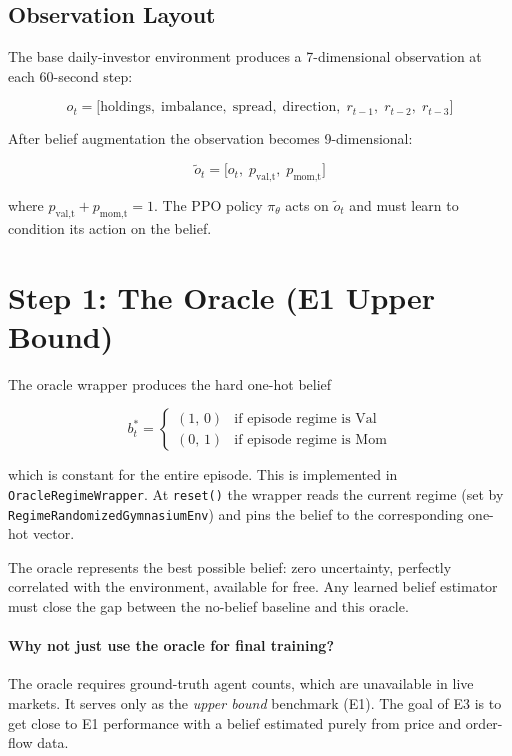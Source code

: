 \documentclass[11pt]{article}
\begin{document}
\subsection{Observation Layout}

The base daily-investor environment produces a 7-dimensional observation at
each 60-second step:

\[
o_t = \bigl[\text{holdings},\; \text{imbalance},\; \text{spread},\;
             \text{direction},\; r_{t-1},\; r_{t-2},\; r_{t-3}\bigr]
\]

\noindent
After belief augmentation the observation becomes 9-dimensional:

\[
\tilde{o}_t = \bigl[o_t,\; p_\text{val,t},\; p_\text{mom,t}\bigr]
\]

\noindent
where $p_\text{val,t} + p_\text{mom,t} = 1$.  The PPO policy $\pi_\theta$
acts on $\tilde{o}_t$ and must learn to condition its action on the belief.

\section{Step 1: The Oracle (E1 Upper Bound)}

The oracle wrapper produces the hard one-hot belief

\[
b^*_t = \begin{cases}(1,\,0) & \text{if episode regime is Val} \\
                      (0,\,1) & \text{if episode regime is Mom}\end{cases}
\]

\noindent
which is constant for the entire episode.  This is implemented in
\texttt{OracleRegimeWrapper}.  At \texttt{reset()} the wrapper reads the
current regime (set by \texttt{RegimeRandomizedGymnasiumEnv}) and pins the
belief to the corresponding one-hot vector.

The oracle represents the best possible belief: zero uncertainty, perfectly
correlated with the environment, available for free.  Any learned belief
estimator must close the gap between the no-belief baseline and this oracle.

\paragraph{Why not just use the oracle for final training?}
The oracle requires ground-truth agent counts, which are unavailable in live
markets.  It serves only as the \emph{upper bound} benchmark (E1).  The goal
of E3 is to get close to E1 performance with a belief estimated purely from
price and order-flow data.
\end{document}
